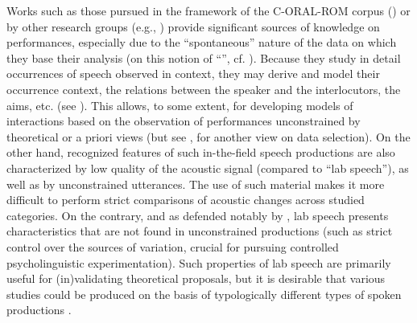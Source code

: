 \documentclass[output=paper]{LSP/langsci}
\begin{document}
Works such as those pursued in the framework of the C-ORAL-ROM corpus (\citealt{Cresti2000,Moneglia2011,Raso2012}) or by other research groups (e.g., \citealt{fontaney1991question,culpeper2003impoliteness,Moraes12}) provide significant sources of knowledge on  performances, especially due to the ``spontaneous'' nature of the data on which they base their analysis (on this notion of ``'', cf. \citealt{blanche1999franccais}). 
Because they study in detail occurrences of speech observed in context, they may derive and model their occurrence context, the relations between the speaker and the interlocutors, the  aims, etc. (see \citealt{kohler2004pragmatic}).
This allows, to some extent, for developing models of interactions based on the observation of performances unconstrained by theoretical or a priori views (but see \citealt{Wagner.2015}, for another view on data selection).  
On the other hand, recognized features of such in-the-field speech productions are also characterized by low quality of the acoustic signal (compared to ``lab speech''), as well as by unconstrained utterances. 
The use of such material makes it more difficult to perform strict comparisons of acoustic changes across studied categories. 
On the contrary, and as defended notably by \citet{Xu2010}, lab speech presents characteristics that are not found in unconstrained productions (such as strict control over the sources of variation, crucial for pursuing controlled psycholinguistic experimentation). 
Such properties of lab speech are primarily useful for (in)validating theoretical proposals, but it is desirable that various studies could be produced on the basis of typologically different types of spoken productions \citep{Wagner.2015}.
\end{document}
